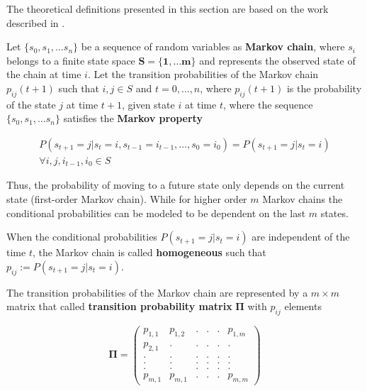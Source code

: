 The theoretical definitions presented in this section are based 
on the work described in \cite{bertsekas2002introduction,Billingsley1961,anderson1957statistical,howard2012dynamic}.

\begin{definition}
	Let $\{s_0, s_1, \ldots s_n\}$ be a sequence of random variables as \textbf{Markov chain}, where $s_i$ belongs to a finite state space $\mathbf{S =\{1,\ldots m\}}$ and represents the observed state of the chain at time $i$. Let the transition probabilities of the Markov chain $p_{ij}(t+1)$ such that $i,j \in S$ and $t=0,\ldots, n$, where  $p_{ij}(t+1)$ is the probability of the state $j$ at time $t+1$, given state $i$ at time $t$, where the sequence $\{s_0, s_1, \ldots s_n\}$ satisfies the \textbf{Markov property} 
	
	\begin{equation}
	\begin{aligned}
	P(s_{t+1}=j|s_{t}=i,s_{t-1}=i_{t-1},\ldots ,s_{0}=i_{0})=P(s_{t+1}=j|s_{t}=i)\\
	\forall i,j,i_{t-1},i_{0} \in S
	\end{aligned}
	\end{equation}

	
	Thus, the probability of moving to a future state only depends on the current  state (first-order Markov chain). While for higher order $m$ Markov chains the conditional probabilities can be modeled to be dependent on the last $m$ states. 
	
	When the conditional probabilities $P(s_{t+1}=j|s_{t}=i)$ are independent of the time $t$, the Markov chain is called \textbf{homogeneous} such that $p_{ij}:=P(s_{t+1}=j|s_{t}=i)$.
	

	
\end{definition}

The transition probabilities of the Markov chain are represented by a $m \times m$  matrix that called \textbf{transition probability matrix} $\boldsymbol{\Pi}$ with $p_{ij}$ elements


\begin{equation}
\label{eq:matrix_example}
\boldsymbol{\Pi} = 
\begin{pmatrix} 
p_{1,1}	   &p_{1,2}  &. 		&. 		& . &  	p_{1,m} \\
p_{2,1}		   &.  & .		& .	    & .	& . \\
. 		   &.  & .		& .	    & .	& . \\
.		   &.  & .		& .		& .	& . \\
.		   &.  & .		& .		& .	& .\\
p_{m,1}	   & p_{m,1}	&.		& .	& .	&p_{m,m}
\end{pmatrix}
\end{equation}

